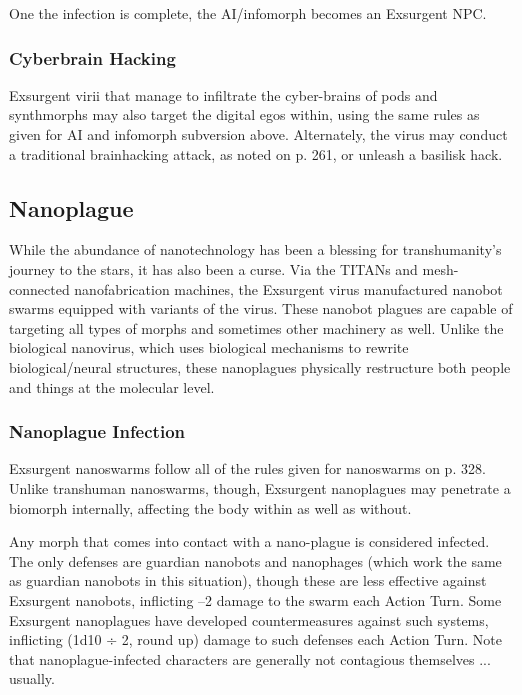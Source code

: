 One the infection is complete, the AI/infomorph 
becomes an Exsurgent NPC.

\subsubsection{Cyberbrain Hacking}

Exsurgent virii that manage to infiltrate the cyber-brains
of pods and synthmorphs may also target the
digital egos within, using the same rules as given for 
AI and infomorph subversion above. Alternately, the 
virus may conduct a traditional brainhacking attack, 
as noted on p. 261, or unleash a basilisk hack. 

\subsection{Nanoplague}

While the abundance of nanotechnology has been a 
blessing for transhumanity's journey to the stars, it has 
also been a curse. Via the TITANs and mesh-connected 
nanofabrication machines, the Exsurgent virus manufactured
nanobot swarms equipped with variants of
the virus. These nanobot plagues are capable of targeting
all types of morphs and sometimes other machinery
as well. Unlike the biological nanovirus, which uses
biological mechanisms to rewrite biological/neural 
structures, these nanoplagues physically restructure 
both people and things at the molecular level.

\subsubsection{Nanoplague Infection}

Exsurgent nanoswarms follow all of the rules given 
for nanoswarms on p. 328. Unlike transhuman 
nanoswarms, though, Exsurgent nanoplagues may 
penetrate a biomorph internally, affecting the body 
within as well as without.

Any morph that comes into contact with a nano-plague
is considered infected. The only defenses are
guardian nanobots and nanophages (which work the 
same as guardian nanobots in this situation), though 
these are less effective against Exsurgent nanobots, 
inflicting –2 damage to the swarm each Action Turn. 
Some Exsurgent nanoplagues have developed countermeasures
against such systems, inflicting (1d10 ÷ 2,
round up) damage to such defenses each Action Turn. 
Note that nanoplague-infected characters are generally
not contagious themselves ... usually.

